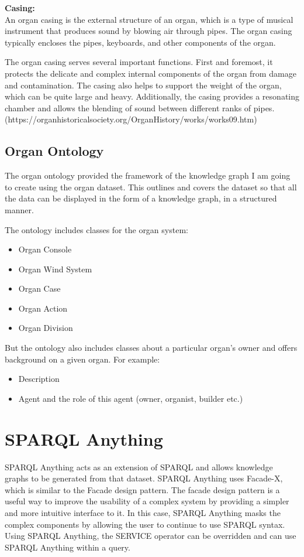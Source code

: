\medskip
\noindent \textbf{Casing:}
\\ \hspace*{0.5cm} 
An organ casing is the external structure of an organ, which is a type of musical instrument that produces sound by blowing air through pipes. The organ casing typically encloses the pipes, keyboards, and other components of the organ.

The organ casing serves several important functions. First and foremost, it protects the delicate and complex internal components of the organ from damage and contamination. The casing also helps to support the weight of the organ, which can be quite large and heavy. Additionally, the casing provides a resonating chamber and allows the blending of sound between different ranks of pipes.\\
(https://organhistoricalsociety.org/OrganHistory/works/works09.htm)

\subsection{Organ Ontology}
\hspace{0.5cm} The organ ontology provided the framework of the knowledge graph I am going to create using the organ dataset. This outlines and covers the dataset so that all the data can be displayed in the form of a knowledge graph, in a structured manner. 

The ontology includes classes for the organ system:
\begin{itemize}
\item Organ Console
\item Organ Wind System
\item Organ Case
\item Organ Action
\item Organ Division
\end{itemize}

But the ontology also includes classes about a particular organ's owner and offers background on a given organ. For example:
\begin{itemize}
\item Description
\item Agent and the role of this agent (owner, organist, builder etc.)
\end{itemize}

\section{SPARQL Anything}
\hspace{0.5cm} SPARQL Anything acts as an extension of SPARQL and allows knowledge graphs to be generated from that dataset. SPARQL Anything uses Facade-X, which is similar to the Facade design pattern. The facade design pattern is a useful way to improve the usability of a complex system by providing a simpler and more intuitive interface to it. In this case, SPARQL Anything masks the complex components by allowing the user to continue to use SPARQL syntax. Using SPARQL Anything, the SERVICE operator can  be overridden and can use SPARQL Anything within a query. 

